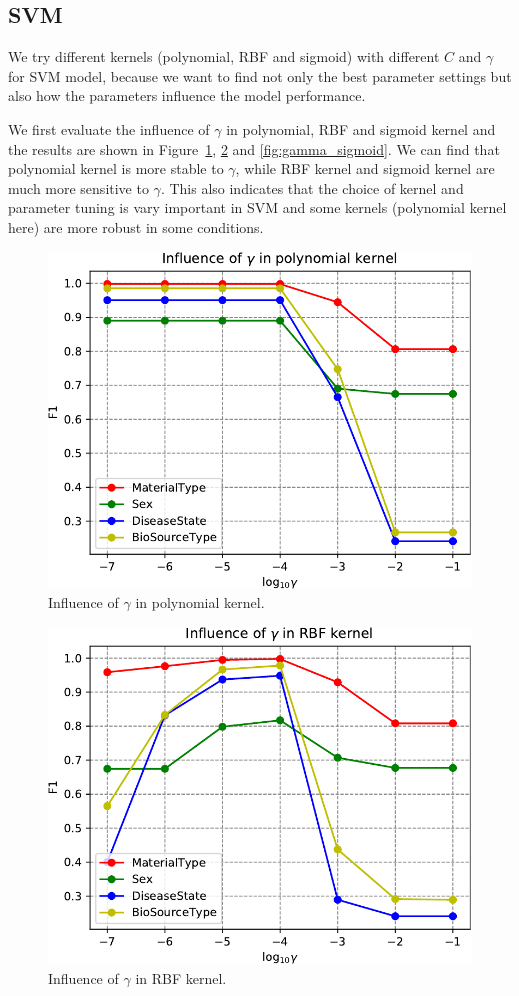 \documentclass[sigconf]{acmart}
\begin{document}
\subsection{SVM}
We try different kernels (polynomial, RBF and sigmoid) with different $C$ and $\gamma$ for SVM model, because we want to find not only the best parameter settings but also how the parameters influence the model performance. 

We first evaluate the influence of $\gamma$ in polynomial, RBF and sigmoid kernel and the results are shown in Figure~\ref{fig:gamma_poly}, \ref{fig:gamma_rbf} and \ref{fig:gamma_sigmoid}. We can find that polynomial kernel is more stable to $\gamma$, while RBF kernel and sigmoid kernel are much more sensitive to $\gamma$. This also indicates that the choice of kernel and parameter tuning is vary important in SVM and some kernels (polynomial kernel here) are more robust in some conditions.

\begin{figure}[h]
\centering
\includegraphics[width=0.8\linewidth]{../figs/gamma_poly}
\caption{Influence of $\gamma$ in polynomial kernel.}
\label{fig:gamma_poly}
\end{figure}

\begin{figure}[h]
\centering
\includegraphics[width=0.8\linewidth]{../figs/gamma_rbf}
\caption{Influence of $\gamma$ in RBF kernel.}
\label{fig:gamma_rbf}
\end{figure}
\end{document}
